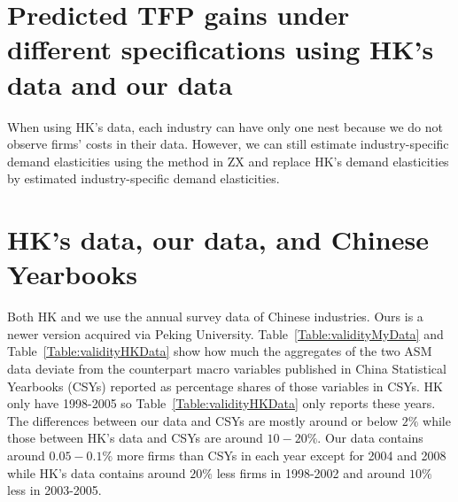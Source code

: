 \documentclass[12pt]{article}
\begin{document}
%

\section{Predicted TFP gains under different specifications using HK's data and our data}
\label{ASec:TFPgainsComparison}
When using HK's data, each industry can have only one nest because we do not observe firms' costs in their data. However, we can still estimate industry-specific demand elasticities using the method in ZX and replace HK's demand elasticities by estimated industry-specific demand elasticities.



\section{HK's data, our data, and Chinese Yearbooks}
 \label{ASec:dataVersion}
%
Both HK and we use the annual survey data of Chinese industries. Ours is a newer version acquired via Peking University. Table~\ref{Table:validityMyData} and Table~\ref{Table:validityHKData} show how much the aggregates of the two ASM data deviate from the counterpart macro variables published in China Statistical Yearbooks (CSYs) reported as percentage shares of those variables in CSYs. HK only have 1998-2005 so Table~\ref{Table:validityHKData} only reports these years. The differences between our data and CSYs are mostly around or below $2\%$ while those between HK's data and CSYs are around $10-20\%$. Our data contains around $0.05-0.1\%$ more firms than CSYs in each year except for 2004 and 2008 while HK's data contains around $20\%$ less firms in 1998-2002 and around $10\%$ less in 2003-2005. %
\end{document}
